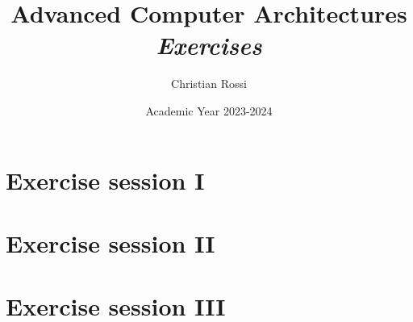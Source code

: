 \documentclass[12pt, a4paper]{report}
\title{Advanced Computer Architectures \\ \textit{Exercises}}
\author{Christian Rossi}
\date{Academic Year 2023-2024}
\begin{document}
    \maketitle

    

    \cleardoublepage{}

    \tableofcontents

    \cleardoublepage{}

    \chapter{Exercise session I}
    
    
    
    

    \chapter{Exercise session II}
    
    

    \chapter{Exercise session III}
    
\end{document}
